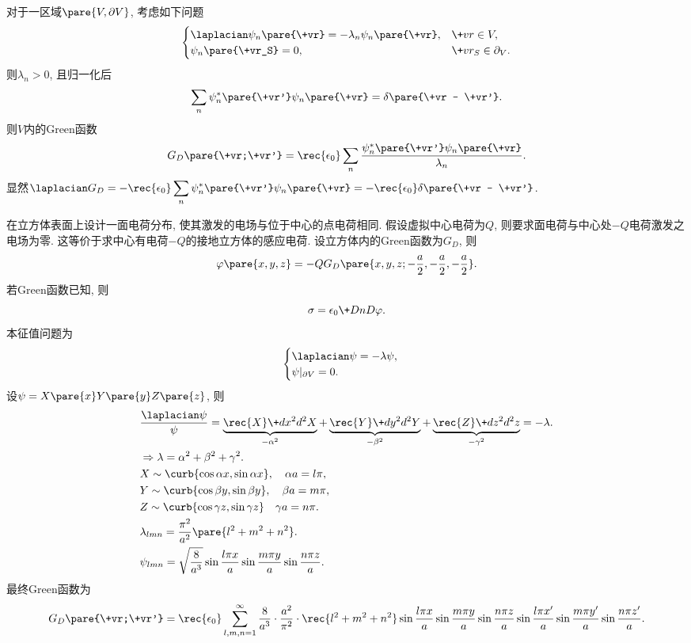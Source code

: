 \documentclass[hidelinks]{ctexart}
\begin{document}
对于一区域$\pare{V,\partial V}$, 考虑如下问题
\[ \begin{cases}
    \laplacian \psi_n\pare{\+vr} = -\lambda_n \psi_n\pare{\+vr}, & \+vr\in V,\\
    \psi_n\pare{\+vr_S} = 0, & \+vr_S \in \partial_V.
\end{cases} \]
则$\lambda_n > 0$, 且归一化后
\[ \sum_n \psi_n^*\pare{\+vr'}\psi_n\pare{\+vr} = \delta\pare{\+vr - \+vr'}. \]
则$V$内的Green函数
\[ G_D\pare{\+vr;\+vr'} = \rec{\epsilon_0}\sum_n \frac{\psi^*_n\pare{\+vr'}\psi_n\pare{\+vr}}{\lambda_n}. \]
显然$\displaystyle \laplacian G_D = -\rec{\epsilon_0} \sum_n \psi_n^*\pare{\+vr'}\psi_n\pare{\+vr} = -\rec{\epsilon_0}\delta\pare{\+vr - \+vr'}$.
\begin{sample}
    \begin{ex}
        在立方体表面上设计一面电荷分布, 使其激发的电场与位于中心的点电荷相同. 假设虚拟中心电荷为$Q$, 则要求面电荷与中心处$-Q$电荷激发之电场为零. 这等价于求中心有电荷$-Q$的接地立方体的感应电荷. 设立方体内的Green函数为$G_D$, 则
        \[ \varphi\pare{x,y,z} = -Q G_D\pare{x,y,z;-\frac{a}{2},-\frac{a}{2},-\frac{a}{2}}. \]
        若Green函数已知, 则
        \[ \sigma = \epsilon_0 \+DnD{\varphi}. \]
        本征值问题为
        \[ \begin{cases}
            \laplacian \psi = -\lambda \psi, \\
            \psi\vert_{\partial V} = 0.
        \end{cases} \]
        设$\psi = X\pare{x}Y\pare{y}Z\pare{z}$, 则
        \begin{align*}
            & \frac{\laplacian \psi}{\psi} = \underbrace{\rec{X}\+d{x^2}d{^2 X}}_{-\alpha^2} + \underbrace{\rec{Y}\+d{y^2}d{^2Y}}_{-\beta^2} + \underbrace{\rec{Z}\+d{z^2}d{^2z}}_{-\gamma^2} = -\lambda.\\
            & \Rightarrow \lambda = \alpha^2 + \beta^2 + \gamma^2. \\
            & X \sim \curb{\cos \alpha x, \sin \alpha x},\quad \alpha a = l\pi, \\
            & Y \sim \curb{\cos \beta y, \sin \beta y},\quad \beta a= m\pi, \\
            & Z \sim \curb{\cos \gamma z, \sin \gamma z}\quad \gamma a = n\pi. \\
            & \lambda_{lmn} = \frac{\pi^2}{a^2}\pare{l^2+m^2+n^2}. \\
            & \psi_{lmn} = \sqrt{\frac{8}{a^3}}\sin \frac{l\pi x}{a}\sin\frac{m\pi y}{a} \sin \frac{n\pi z}{a}.
        \end{align*}
        最终Green函数为
        \[ G_D\pare{\+vr;\+vr'} = \rec{\epsilon_0}\sum_{l,m,n=1}^\infty \frac{8}{a^3}\cdot \frac{a^2}{\pi^2}\cdot \rec{l^2+m^2+n^2} \sin \frac{l\pi x}{a}\sin\frac{m\pi y}{a} \sin \frac{n\pi z}{a}\sin \frac{l\pi x'}{a}\sin\frac{m\pi y'}{a} \sin \frac{n\pi z'}{a}. \]
    \end{ex}
\end{sample}
\end{document}

